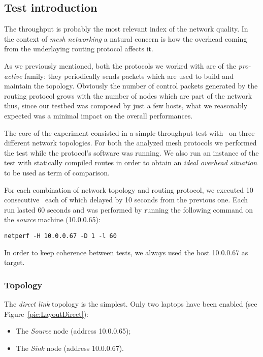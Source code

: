 \subsection{Test introduction}

    The throughput is probably the most relevant index of the network
    quality. In the context of \emph{mesh networking} a natural concern is
    how the overhead coming from the underlaying routing protocol affects
    it.

    As we previously mentioned, both the protocols we worked
    with are of the \emph{pro-active} family: they periodically sends
    packets which are used to build and maintain the topology. Obviously
    the number of control packets generated by the routing protocol grows
    with the number of nodes which are part of the network thus, since our
    testbed was composed by just a few hosts, what we reasonably expected
    was a minimal impact on the overall performances.

    The core of the experiment consisted in a simple throughput test with
    \netperf\ on three different network topologies. For both the
    analyzed mesh protocols we performed the test while the protocol's
    software was running. We also run an instance of the test with
    statically compiled routes in order to obtain an \emph{ideal overhead
    situation} to be used as term of comparison.

    For each combination of network topology and routing protocol, we
    executed 10 consecutive \netperf\ each of which delayed by 10 seconds
    from the previous one. Each run lasted 60 seconds and was performed by
    running the following command on the \emph{source} machine (10.0.0.65):
\begin{verbatim}
netperf -H 10.0.0.67 -D 1 -l 60
\end{verbatim}

    In order to keep coherence between tests, we always used the host
    10.0.0.67 as target.

    \subsubsection{Topology}

        The \emph{direct link} topology is the simplest. Only two laptops
        have been enabled (see Figure~\ref{pic:LayoutDirect}):
        \begin{itemize}
        \item   The \emph{Source} node (address 10.0.0.65);
        \item   The \emph{Sink} node (address 10.0.0.67).
        \end{itemize}

